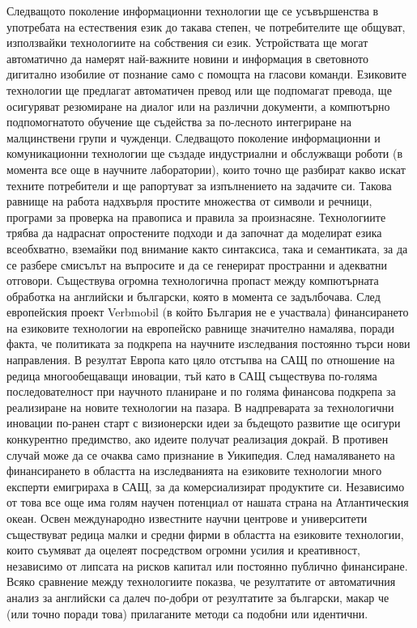 \begin{multicols}{2}
Следващото поколение информационни технологии ще се усъвършенства в употребата на естествения език до такава степен, че потребителите ще общуват, използвайки технологиите на собствения си език. Устройствата ще могат автоматично да намерят най-важните новини и информация в световното дигитално изобилие от познание само с помощта на гласови команди. Езиковите технологии ще предлагат автоматичен превод или ще подпомагат превода, ще осигуряват резюмиране на диалог или на различни документи, а компютърно подпомогнатото обучение ще съдейства за по-лесното интегриране на малцинствени групи и чужденци. 
Следващото поколение информационни и комуникационни технологии ще създаде индустриални и обслужващи роботи (в момента все още в научните лаборатории), които точно ще разбират какво искат техните потребители и ще рапортуват за изпълнението на задачите си. Такова равнище на работа надхвърля простите множества от символи и речници, програми за проверка на правописа и правила за произнасяне. Технологиите трябва да надраснат опростените подходи и да започнат да моделират езика всеобхватно, вземайки под внимание както синтаксиса, така и семантиката, за да се разбере смисълът на въпросите и да се генерират пространни и адекватни отговори.
Съществува огромна технологична пропаст между компютърната обработка на английски и български, която в момента се задълбочава. След европейския проект Verbmobil (в който България не е участвала) финансирането на езиковите технологии на европейско равнище значително намалява, поради факта, че политиката за  подкрепа на научните изследвания постоянно търси нови направления. В резултат Европа като цяло отстъпва на САЩ по отношение на редица многообещаващи иновации, тъй като в САЩ съществува по-голяма последователност при научното планиране и по голяма финансова подкрепа за реализиране на новите технологии на пазара.
В надпреварата за технологични иновации по-ранен старт с визионерски идеи за бъдещото развитие ще осигури конкурентно предимство, ако идеите получат реализация докрай. В противен случай може да се очаква само признание в Уикипедия. След намаляването на финансирането в областта на изследванията на езиковите технологии много експерти емигрираха в САЩ, за да комерсиализират продуктите си. Независимо от това все още има голям научен потенциал от нашата страна на Атлантическия океан.
Освен международно известните научни центрове и университети съществуват редица малки и средни фирми в областта на езиковите технологии, които съумяват да оцелеят посредством огромни усилия и креативност, независимо от липсата на рисков капитал или постоянно публично финансиране. Всяко сравнение между технологиите  показва, че резултатите от автоматичния анализ за английски са далеч по-добри от резултатите за български, макар че (или точно поради това) прилаганите методи са подобни или идентични.

\end{multicols}
